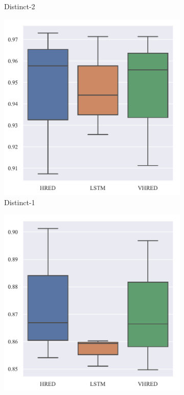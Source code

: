 \begin{figure}[H]
\begin{subfigure}{0.25\linewidth}
        \caption{Distinct-2}
    \end{subfigure}%
    \begin{subfigure}{0.25\linewidth}
        \centering
        \includegraphics[width=\linewidth]{figure/boxplot/model/distinct_1/plot.pdf}
        \caption{Distinct-1}
    \end{subfigure}%
    \begin{subfigure}{0.25\linewidth}
        \centering
        \includegraphics[width=\linewidth]{figure/boxplot/model/distinct_2/plot.pdf}

\end{subfigure}
\end{figure}
